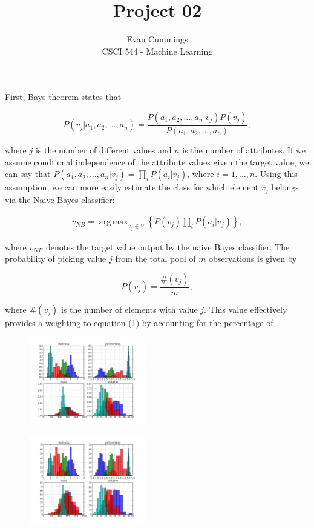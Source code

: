 
\DeclareMathOperator*{\argmax}{arg\,max}


\small

\title{Project 02}
\author{Evan Cummings\\
CSCI 544 - Machine Learning}

\maketitle

First, Bays theorem states that

$$ P(v_j | a_1, a_2, \ldots, a_n) = \frac{P(a_1, a_2, \ldots, a_n | v_j) P(v_j)}{P(a_1,a_2,\ldots,a_n)},$$

where $j$ is the number of different values and $n$ is the number of attributes.  If we assume condtional independence of the attribute values given the target value, we can say that $P(a_1, a_2, \ldots, a_n | v_j) = \prod_i P(a_i | v_j)$, where $i = 1,\ldots,n$.  Using this assumption, we can more easily estimate the class for which element $v_j$ belongs via the Naive Bayes classifier:

\begin{align}
  v_{NB} = \argmax_{v_j \in V}\left\{ P(v_j) \prod_i P(a_i | v_j) \right\},
\end{align}

where $v_{NB}$ denotes the target value output by the naive Bayes classifier.  The probability of picking value $j$ from the total pool of $m$ observations is given by

$$ P(v_j) = \frac{\#(v_j)}{m},$$

where $\#(v_j)$ is the number of elements with value $j$.  This value effectively provides a weighting to equation (1) by accounting for the percentage of 

\begin{multicols}{2}
\begin{figure}[H]
  \centering
		\includegraphics[width=0.45\textwidth]{images/normed.png}
\end{figure}
\vspace{5mm}

\begin{figure}[H]
  \centering
		\includegraphics[width=0.45\textwidth]{images/not_normed.png}
\end{figure}
\vspace{5mm}
\end{multicols}





